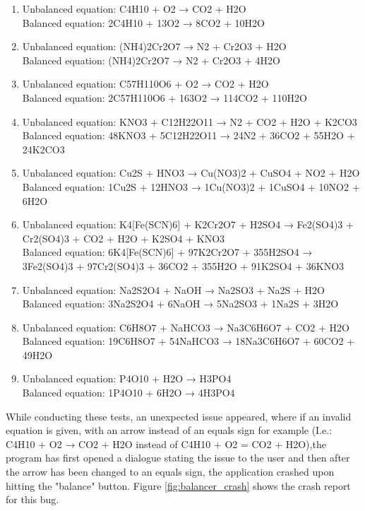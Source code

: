 \documentclass[a4paper,12pt]{article}
\begin{document}
\begin{enumerate}

\item Unbalanced equation: C4H10 + O2 → CO2 + H2O\\ Balanced equation: 2C4H10 + 13O2 → 8CO2 + 10H2O

\item Unbalanced equation: (NH4)2Cr2O7 → N2 + Cr2O3 + H2O\\ Balanced equation: (NH4)2Cr2O7 → N2 + Cr2O3 + 4H2O

\item Unbalanced equation: C57H110O6 + O2 → CO2 + H2O\\ Balanced equation: 2C57H110O6 + 163O2 → 114CO2 + 110H2O

\item Unbalanced equation: KNO3 + C12H22O11 → N2 + CO2 + H2O + K2CO3\\ Balanced equation: 48KNO3 + 5C12H22O11 → 24N2 + 36CO2 + 55H2O + 24K2CO3

\item Unbalanced equation: Cu2S + HNO3 → Cu(NO3)2 + CuSO4 + NO2 + H2O\\ Balanced equation: 1Cu2S + 12HNO3 → 1Cu(NO3)2 + 1CuSO4 + 10NO2 + 6H2O

\item Unbalanced equation: K4[Fe(SCN)6] + K2Cr2O7 + H2SO4 → Fe2(SO4)3 + Cr2(SO4)3 + CO2 + H2O + K2SO4 + KNO3\\ Balanced equation: 6K4[Fe(SCN)6] + 97K2Cr2O7 + 355H2SO4 → 3Fe2(SO4)3 + 97Cr2(SO4)3 + 36CO2 + 355H2O + 91K2SO4 + 36KNO3

\item Unbalanced equation: Na2S2O4 + NaOH → Na2SO3 + Na2S + H2O\\ Balanced equation: 3Na2S2O4 + 6NaOH → 5Na2SO3 + 1Na2S + 3H2O

\item Unbalanced equation: C6H8O7 + NaHCO3 → Na3C6H6O7 + CO2 + H2O\\ Balanced equation: 19C6H8O7 + 54NaHCO3 → 18Na3C6H6O7 + 60CO2 + 49H2O

\item Unbalanced equation: P4O10 + H2O → H3PO4\\ Balanced equation: 1P4O10 + 6H2O → 4H3PO4

\end{enumerate}

While conducting these tests, an unexpected issue appeared, where if an invalid equation is given, with an arrow instead of an equals sign for example (I.e.: C4H10 + O2 → CO2 + H2O instead of C4H10 + O2 = CO2 + H2O),the program has first opened a dialogue stating the issue to the user and then after the arrow has been changed to an equals sign, the application crashed upon hitting the "balance" button. Figure \ref{fig:balancer_crash} shows the crash report for this bug. 
\end{document}
